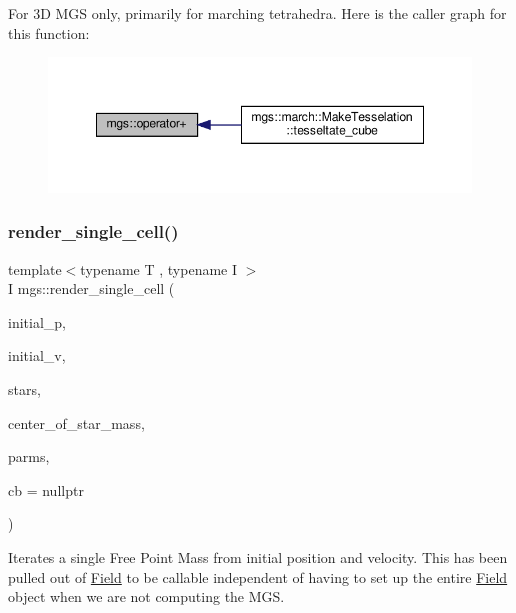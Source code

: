 For 3D M\+GS only, primarily for marching tetrahedra. Here is the caller graph for this function\+:
\nopagebreak
\begin{figure}[H]
\begin{center}
\leavevmode
\includegraphics[width=348pt]{namespacemgs_aa3d52c646ace701de74ece1b83e81c3d_icgraph}
\end{center}
\end{figure}
\mbox{\label{namespacemgs_aa8de51b8fb971ca949d932b8348298d1}} 
\subsubsection{\texorpdfstring{render\+\_\+single\+\_\+cell()}{render\_single\_cell()}}
{\footnotesize\ttfamily template$<$typename T , typename I $>$ \\
I mgs\+::render\+\_\+single\+\_\+cell (\begin{DoxyParamCaption}\item[{const \hyperlink{structmgs_1_1Vector}{Position} \&}]{initial\+\_\+p,  }\item[{const \hyperlink{structmgs_1_1Vector}{Velocity} \&}]{initial\+\_\+v,  }\item[{const std\+::vector$<$ \hyperlink{structmgs_1_1Star}{Star} $>$ \&}]{stars,  }\item[{const \hyperlink{structmgs_1_1Vector}{Position} \&}]{center\+\_\+of\+\_\+star\+\_\+mass,  }\item[{const \hyperlink{structmgs_1_1FieldParms}{Field\+Parms}$<$ T, I $>$ \&}]{parms,  }\item[{std\+::function$<$ void(const \hyperlink{structmgs_1_1Vector}{Position} \&, const \hyperlink{structmgs_1_1Vector}{Velocity} \&)$>$}]{cb = {\ttfamily nullptr} }\end{DoxyParamCaption})\hspace{0.3cm}{\ttfamily [inline]}}

Iterates a single Free Point Mass from initial position and velocity. This has been pulled out of \hyperlink{structmgs_1_1Field}{Field} to be callable independent of having to set up the entire \hyperlink{structmgs_1_1Field}{Field} object when we are not computing the M\+GS. 